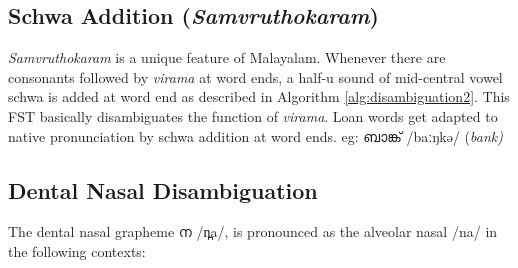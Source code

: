 \subsection{Schwa Addition (\textit{Samvruthokaram})}

\textit{Samvruthokaram} is a unique feature of Malayalam. Whenever there are consonants followed by \textit{virama} at word ends, a half-u sound of mid-central vowel schwa is added at word end as described in Algorithm \ref{alg:disambiguation2}. This FST basically disambiguates the function of \textit{virama}. Loan words get adapted to native pronunciation by schwa addition at word ends. eg: {\mal ബാങ്ക്} {\ipa /baːŋkə/} (\textit{bank)}



\subsection{Dental Nasal Disambiguation}

The dental nasal grapheme {\mal ന} {\ipa /n̪a/}, is pronounced as the alveolar
nasal {\ipa /na/} in the following contexts\cite{prabo2016}:

